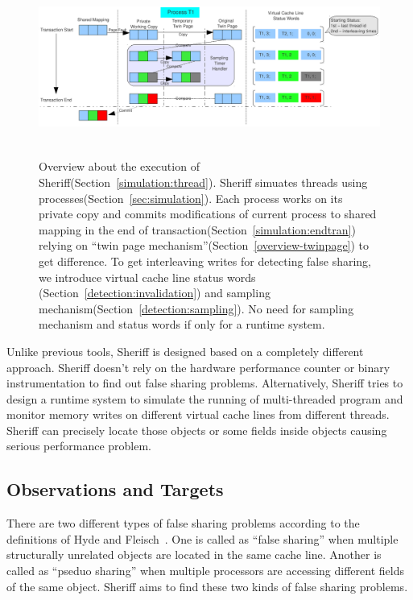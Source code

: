 \label{sec:overview}

\begin{figure}[!t]
\centering
\includegraphics[height=2.3in]{figure/overview.pdf}
\caption{
Overview about the execution of Sheriff(Section~\ref{simulation:thread}). 
Sheriff simuates threads using processes(Section~\ref{sec:simulation}). 
Each process works on its private copy  
and commits modifications of current process to shared mapping in the end of transaction(Section~\ref{simulation:endtran})
relying on ``twin page mechanism''(Section~\ref{overview-twinpage}) to get difference. 
To get interleaving writes for detecting false sharing, 
we introduce virtual cache line status words (Section~\ref{detection:invalidation}) 
and sampling mechanism(Section~\ref{detection:sampling}). 
No need for sampling mechanism and status words if only for a runtime system.
\label{fig:overview}}
\end{figure}

Unlike previous tools, Sheriff is designed based on a completely different approach.
Sheriff doesn't rely on the hardware performance counter or binary instrumentation to find out false sharing problems. 
Alternatively, Sheriff tries to design a runtime system to simulate the running of multi-threaded program and 
monitor memory writes on different virtual cache lines from different threads.
Sheriff can precisely locate those objects or some fields inside objects causing serious performance problem. 

\subsection{Observations and Targets}
\label{overview:target}
There are two different types of false sharing problems according to 
the definitions of Hyde and Fleisch~\cite{falseshare:Analysis}. 
One is called as ``false sharing'' when multiple structurally unrelated objects 
are located in the same cache line. 
Another is called as ``pseduo sharing'' when multiple processors 
are accessing different fields of the same object.
Sheriff aims to find these two kinds of false sharing problems. 

